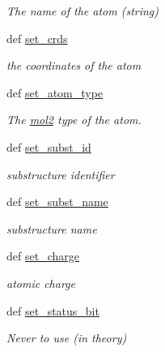 \begin{DoxyCompactItemize}
\begin{DoxyCompactList}\small\item\em The name of the atom (string) \end{DoxyCompactList}\item 
def \hyperlink{classforcebalance_1_1Mol2_1_1mol2__atom_a3a6c9728119ace119108183920689a9d}{set\-\_\-crds}
\begin{DoxyCompactList}\small\item\em the coordinates of the atom \end{DoxyCompactList}\item 
def \hyperlink{classforcebalance_1_1Mol2_1_1mol2__atom_a233ebfedcde7e5d75b0ec54f194d2b4f}{set\-\_\-atom\-\_\-type}
\begin{DoxyCompactList}\small\item\em The \hyperlink{classforcebalance_1_1Mol2_1_1mol2}{mol2} type of the atom. \end{DoxyCompactList}\item 
def \hyperlink{classforcebalance_1_1Mol2_1_1mol2__atom_ae879ba27197a573b6e3e1e97f0b76aff}{set\-\_\-subst\-\_\-id}
\begin{DoxyCompactList}\small\item\em substructure identifier \end{DoxyCompactList}\item 
def \hyperlink{classforcebalance_1_1Mol2_1_1mol2__atom_af149e1d049adee0318eef510a8d32f9c}{set\-\_\-subst\-\_\-name}
\begin{DoxyCompactList}\small\item\em substructure name \end{DoxyCompactList}\item 
def \hyperlink{classforcebalance_1_1Mol2_1_1mol2__atom_abfe80eac2952ad867d87e8b6e64f3c09}{set\-\_\-charge}
\begin{DoxyCompactList}\small\item\em atomic charge \end{DoxyCompactList}\item 
def \hyperlink{classforcebalance_1_1Mol2_1_1mol2__atom_a2b8855f5349976b26917fee353618354}{set\-\_\-status\-\_\-bit}
\begin{DoxyCompactList}\small\item\em Never to use (in theory) \end{DoxyCompactList}\end{DoxyCompactItemize}
